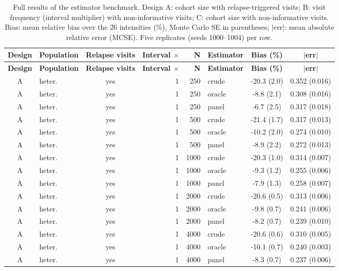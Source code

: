 \documentclass[11pt,a4paper]{article}
\begin{document}
\begin{longtable}{clcrrlcc}
\caption{Full results of the estimator benchmark. Design A: cohort size with relapse-triggered visits; B: visit frequency (interval multiplier) with non-informative visits; C: cohort size with non-informative visits. Bias: mean relative bias over the 26 intensities (\%), Monte Carlo SE in parentheses; $|$err$|$: mean absolute relative error (MCSE). Five replicates (seeds 1000--1004) per row.}\label{tab:S2}\\
\toprule
\textbf{Design} & \textbf{Population} & \textbf{Relapse visits} & \textbf{Interval $\times$} & \textbf{N} & \textbf{Estimator} & \textbf{Bias (\%)} & \textbf{$|$err$|$}\\
\midrule\endfirsthead
\toprule \textbf{Design} & \textbf{Population} & \textbf{Relapse visits} & \textbf{Interval $\times$} & \textbf{N} & \textbf{Estimator} & \textbf{Bias (\%)} & \textbf{$|$err$|$}\\ \midrule\endhead
A & heter. & yes & 1 & 250 & crude & -20.3 (2.0) & 0.352 (0.016) \\
A & heter. & yes & 1 & 250 & oracle & -8.8 (2.1) & 0.308 (0.016) \\
A & heter. & yes & 1 & 250 & panel & -6.7 (2.5) & 0.317 (0.018) \\
A & heter. & yes & 1 & 500 & crude & -21.4 (1.7) & 0.317 (0.013) \\
A & heter. & yes & 1 & 500 & oracle & -10.2 (2.0) & 0.274 (0.010) \\
A & heter. & yes & 1 & 500 & panel & -8.9 (2.2) & 0.272 (0.013) \\
A & heter. & yes & 1 & 1000 & crude & -20.3 (1.0) & 0.314 (0.007) \\
A & heter. & yes & 1 & 1000 & oracle & -9.3 (1.2) & 0.255 (0.006) \\
A & heter. & yes & 1 & 1000 & panel & -7.9 (1.3) & 0.258 (0.007) \\
A & heter. & yes & 1 & 2000 & crude & -20.6 (0.5) & 0.313 (0.006) \\
A & heter. & yes & 1 & 2000 & oracle & -9.8 (0.7) & 0.241 (0.006) \\
A & heter. & yes & 1 & 2000 & panel & -8.2 (0.7) & 0.239 (0.010) \\
A & heter. & yes & 1 & 4000 & crude & -20.6 (0.6) & 0.310 (0.005) \\
A & heter. & yes & 1 & 4000 & oracle & -10.1 (0.7) & 0.240 (0.003) \\
A & heter. & yes & 1 & 4000 & panel & -8.3 (0.7) & 0.237 (0.006) \\

\end{longtable}
\end{document}
